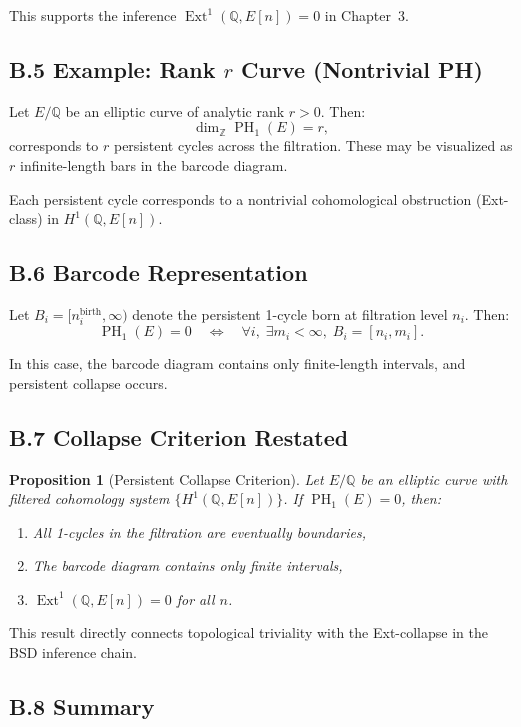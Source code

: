 \documentclass[11pt]{article}
\newtheorem{proposition}[theorem]{Proposition}
\DeclareMathOperator{\Ext}{Ext}
\DeclareMathOperator{\PH}{PH}
\newcommand{\QQ}{\mathbb{Q}}
\newcommand{\ZZ}{\mathbb{Z}}
\begin{document}
This supports the inference $\Ext^1(\QQ,E[n]) = 0$ in Chapter~3.

\subsection*{B.5 Example: Rank $r$ Curve (Nontrivial PH)}

Let $E/\QQ$ be an elliptic curve of analytic rank $r > 0$.  
Then:
\[
\dim_{\ZZ} \PH_1(E) = r,
\]
corresponds to $r$ persistent cycles across the filtration.  
These may be visualized as $r$ infinite-length bars in the barcode diagram.

Each persistent cycle corresponds to a nontrivial cohomological obstruction (Ext-class) in $H^1(\QQ, E[n])$.

\subsection*{B.6 Barcode Representation}

Let $B_i = [n_i^{\mathrm{birth}}, \infty)$ denote the persistent 1-cycle born at filtration level $n_i$.  
Then:
\[
\PH_1(E) = 0 \quad \Longleftrightarrow \quad \forall i,\; \exists m_i < \infty,\; B_i = [n_i, m_i].
\]

In this case, the barcode diagram contains only finite-length intervals, and persistent collapse occurs.

\subsection*{B.7 Collapse Criterion Restated}

\begin{proposition}[Persistent Collapse Criterion]
\label{prop:ph-collapse-criterion}
Let $E/\QQ$ be an elliptic curve with filtered cohomology system $\{H^1(\QQ, E[n])\}$.  
If $\PH_1(E) = 0$, then:
\begin{enumerate}
  \item All 1-cycles in the filtration are eventually boundaries,
  \item The barcode diagram contains only finite intervals,
  \item $\Ext^1(\QQ, E[n]) = 0$ for all $n$.
\end{enumerate}
\end{proposition}

This result directly connects topological triviality with the Ext-collapse in the BSD inference chain.

\subsection*{B.8 Summary}
\end{document}
